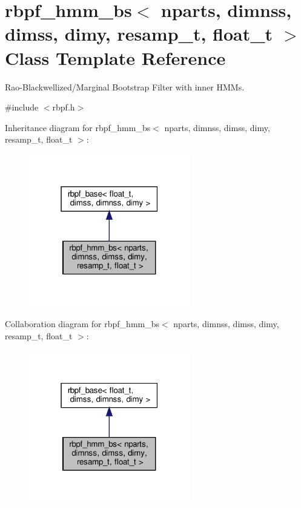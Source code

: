 \hypertarget{classrbpf__hmm__bs}{}\section{rbpf\+\_\+hmm\+\_\+bs$<$ nparts, dimnss, dimss, dimy, resamp\+\_\+t, float\+\_\+t $>$ Class Template Reference}
\label{classrbpf__hmm__bs}


Rao-\/\+Blackwellized/\+Marginal Bootstrap Filter with inner H\+M\+Ms.  




{\ttfamily \#include $<$rbpf.\+h$>$}



Inheritance diagram for rbpf\+\_\+hmm\+\_\+bs$<$ nparts, dimnss, dimss, dimy, resamp\+\_\+t, float\+\_\+t $>$\+:
\nopagebreak
\begin{figure}[H]
\begin{center}
\leavevmode
\includegraphics[width=199pt]{classrbpf__hmm__bs__inherit__graph}
\end{center}
\end{figure}


Collaboration diagram for rbpf\+\_\+hmm\+\_\+bs$<$ nparts, dimnss, dimss, dimy, resamp\+\_\+t, float\+\_\+t $>$\+:
\nopagebreak
\begin{figure}[H]
\begin{center}
\leavevmode
\includegraphics[width=199pt]{classrbpf__hmm__bs__coll__graph}
\end{center}
\end{figure}
